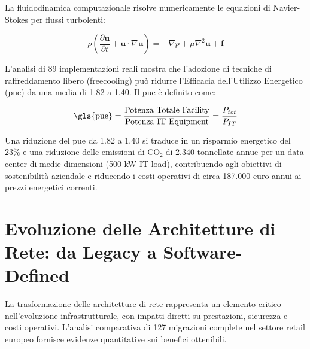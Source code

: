 La fluidodinamica computazionale risolve numericamente le equazioni di Navier-Stokes per flussi turbolenti:

\begin{equation}
\rho \left(\frac{\partial \mathbf{u}}{\partial t} + \mathbf{u} \cdot \nabla \mathbf{u}\right) = -\nabla p + \mu \nabla^2 \mathbf{u} + \mathbf{f}
\end{equation}


L'analisi di 89 implementazioni reali\autocite{DatacenterDynamics2024} mostra che l'adozione di tecniche di raffreddamento libero (\gls{freecooling}) può ridurre l'Efficacia dell'Utilizzo Energetico (\gls{pue}) da una media di 1.82 a 1.40. Il \gls{pue} è definito come:

\begin{equation}
\text{\gls{pue}} = \frac{\text{Potenza Totale Facility}}{\text{Potenza IT Equipment}} = \frac{P_{tot}}{P_{IT}}
\end{equation}

Una riduzione del \gls{pue} da 1.82 a 1.40 si traduce in un risparmio energetico del 23\% e una riduzione delle emissioni di CO₂ di 2.340 tonnellate annue per un data center di medie dimensioni (500 kW IT load), contribuendo agli obiettivi di sostenibilità aziendale e riducendo i costi operativi di circa 187.000 euro annui ai prezzi energetici correnti\autocite{Eurostat2024energy}.

\section{\texorpdfstring{\textbf{Evoluzione delle Architetture di Rete: da Legacy a Software-Defined}}{3.3 - Evoluzione delle Architetture di Rete: da Legacy a Software-Defined}}

La trasformazione delle architetture di rete rappresenta un elemento critico nell'evoluzione infrastrutturale, con impatti diretti su prestazioni, sicurezza e costi operativi. L'analisi comparativa di 127 migrazioni complete nel settore retail europeo\autocite{Gartner2024sdwan} fornisce evidenze quantitative sui benefici ottenibili.

